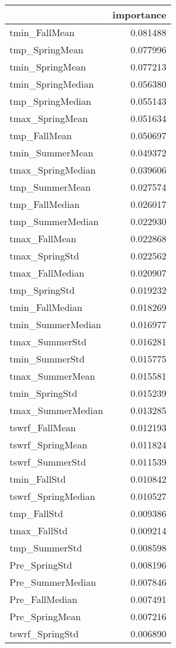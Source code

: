 \begin{tabular}{lr}
\toprule
 & importance \\
\midrule
tmin_FallMean & 0.081488 \\
tmp_SpringMean & 0.077996 \\
tmin_SpringMean & 0.077213 \\
tmin_SpringMedian & 0.056380 \\
tmp_SpringMedian & 0.055143 \\
tmax_SpringMean & 0.051634 \\
tmp_FallMean & 0.050697 \\
tmin_SummerMean & 0.049372 \\
tmax_SpringMedian & 0.039606 \\
tmp_SummerMean & 0.027574 \\
tmp_FallMedian & 0.026017 \\
tmp_SummerMedian & 0.022930 \\
tmax_FallMean & 0.022868 \\
tmax_SpringStd & 0.022562 \\
tmax_FallMedian & 0.020907 \\
tmp_SpringStd & 0.019232 \\
tmin_FallMedian & 0.018269 \\
tmin_SummerMedian & 0.016977 \\
tmax_SummerStd & 0.016281 \\
tmin_SummerStd & 0.015775 \\
tmax_SummerMean & 0.015581 \\
tmin_SpringStd & 0.015239 \\
tmax_SummerMedian & 0.013285 \\
tswrf_FallMean & 0.012193 \\
tswrf_SpringMean & 0.011824 \\
tswrf_SummerStd & 0.011539 \\
tmin_FallStd & 0.010842 \\
tswrf_SpringMedian & 0.010527 \\
tmp_FallStd & 0.009386 \\
tmax_FallStd & 0.009214 \\
tmp_SummerStd & 0.008598 \\
Pre_SpringStd & 0.008196 \\
Pre_SummerMedian & 0.007846 \\
Pre_FallMedian & 0.007491 \\
Pre_SpringMean & 0.007216 \\
tswrf_SpringStd & 0.006890 \\

\end{tabular}
